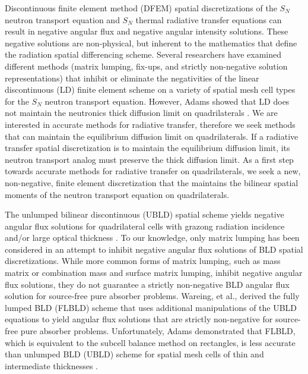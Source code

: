 \documentclass{mc2015}
\begin{document}
Discontinuous finite element method (DFEM) spatial discretizations of the $S_N$ neutron transport equation and $S_N$ thermal radiative transfer equations can result in negative angular flux and negative angular intensity solutions.  
These negative solutions are non-physical, but inherent to the mathematics that define the radiation spatial differencing scheme.
Several researchers have examined different methods (matrix lumping\cite{adams_dfem}, fix-ups\cite{fichtl}, and strictly non-negative solution representations\cite{csz_me}) that inhibit or eliminate the negativities of the linear discontinuous (LD) finite element scheme on  a variety of spatial mesh cell types for the $S_N$ neutron transport equation.
However, Adams showed that LD does not maintain the neutronics thick diffusion limit on quadrilaterals \cite{adams_dfem}.
We are interested in accurate methods for radiative transfer, therefore we seek methods that can maintain the equilibrium diffusion limit on quadrilaterals.
If a radiative transfer spatial discretization is to maintain the equilibrium diffusion limit, its neutron transport analog must preserve the thick diffusion limit.
As a first step towards accurate methods for radiative transfer on quadrilaterals, we seek a new, non-negative, finite element discretization that the maintains the bilinear spatial moments of the neutron transport equation on quadrilaterals.

The unlumped bilinear discontinuous (UBLD) spatial scheme yields negative angular flux solutions for quadrilateral cells with grazong radiation incidence and/or large optical thickness \cite{adams_dfem}. 
To our knowledge, only matrix lumping has been considered  in an attempt to inhibit negative angular flux solutions of BLD spatial discretizations.
While more common forms of matrix lumping, such as mass matrix or combination mass and surface matrix lumping, inhibit negative angular flux solutions, they do not guarantee a strictly non-negative BLD angular flux solution  for source-free pure absorber problems\cite{adams_dfem}.
Wareing, et al., derived the fully lumped BLD (FLBLD) scheme \cite{flbld} that uses additional manipulations of the UBLD equations to yield angular flux solutions that are strictly non-negative for source-free pure absorber problems.
Unfortunately, Adams demonstrated that FLBLD, which is equivalent to the subcell balance method on rectangles, is less accurate than unlumped BLD (UBLD) scheme for spatial mesh cells of thin and intermediate thicknesses \cite{adams_scb}.
\end{document}
